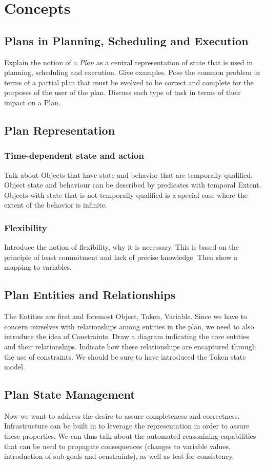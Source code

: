 \documentclass[10pt, letterpaper, twoside]{article}
\begin{document}
\section{Concepts}
\subsection{Plans in Planning, Scheduling and Execution}
Explain the notion of a {\em Plan} as a central representation of state that is used in planning, scheduling and execution. Give examples. Pose the common problem in terms of a partial plan that must be evolved to be correct and complete for the purposes of the user of the plan. Discuss each type of task in terms of their impact on a Plan.
\subsection{Plan Representation}
\subsubsection{Time-dependent state and action}
Talk about Objects that have state and behavior that are temporally qualified. Object state and behaviour can be described by predicates with temporal Extent. Objects with state that is not temporally qualified is a special case where the extent of the behavior is infinite.
\subsubsection{Flexibility}
Introduce the notion of flexibility, why it is necessary. This is based on the principle of least commitment and lack of precise knowledge. Then show a mapping to variables.
\subsection{Plan Entities and Relationships}
The Entities are first and foremost Object, Token, Variable. Since we have to concern ourselves with relationships among entities in the plan, we need to also introduce the idea of Constraints. Draw a diagram indicating the core entities and their relationships. Indicate how these relationships are encaptured through the use of constraints. We should be sure to have introduced the Token state model.
\subsection{Plan State Management}
Now we want to address the desire to assure completeness and correctness. Infrastructure can be built in to leverage the representation in order to assure these properties. We can thus talk about the automated reasonining capabilities that can be used to propagate consequences (changes to variable values, introduction of sub-goals and ocnstraints), as well as test for consistency.
\end{document}
